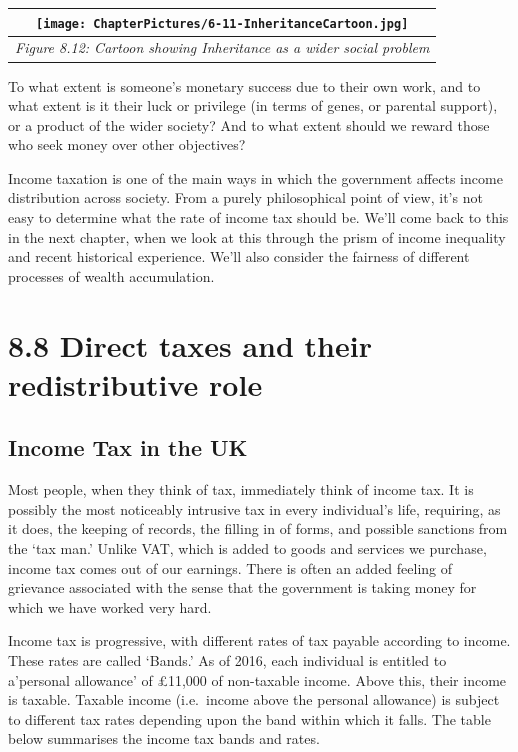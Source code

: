 \documentclass[]{tufte-handout}
\begin{document}
\begin{longtable}[]{@{}c@{}}
\toprule
\texttt{[image: ChapterPictures/6-11-InheritanceCartoon.jpg]}\tabularnewline
\midrule
\endhead
\emph{Figure 8.12: Cartoon showing Inheritance as a wider social
problem}\tabularnewline
\bottomrule
\end{longtable}

To what extent is someone's monetary success due to their own work, and
to what extent is it their luck or privilege (in terms of genes, or
parental support), or a product of the wider society? And to what extent
should we reward those who seek money over other objectives?

Income taxation is one of the main ways in which the government affects
income distribution across society. From a purely philosophical point of
view, it's not easy to determine what the rate of income tax should be.
We'll come back to this in the next chapter, when we look at this
through the prism of income inequality and recent historical experience.
We'll also consider the fairness of different processes of wealth
accumulation.

\hypertarget{direct-taxes-and-their-redistributive-role}{%
\section{8.8 Direct taxes and their redistributive
role}\label{direct-taxes-and-their-redistributive-role}}

\hypertarget{income-tax-in-the-uk}{%
\subsection{Income Tax in the UK}\label{income-tax-in-the-uk}}

Most people, when they think of tax, immediately think of income tax. It
is possibly the most noticeably intrusive tax in every individual's
life, requiring, as it does, the keeping of records, the filling in of
forms, and possible sanctions from the `tax man.' Unlike VAT, which is
added to goods and services we purchase, income tax comes out of our
earnings. There is often an added feeling of grievance associated with
the sense that the government is taking money for which we have worked
very hard.

Income tax is progressive, with different rates of tax payable according
to income. These rates are called `Bands.' As of 2016, each individual
is entitled to a'personal allowance' of £11,000 of non-taxable income.
Above this, their income is taxable. Taxable income (i.e.~income above
the personal allowance) is subject to different tax rates depending upon
the band within which it falls. The table below summarises the income
tax bands and rates.
\end{document}
